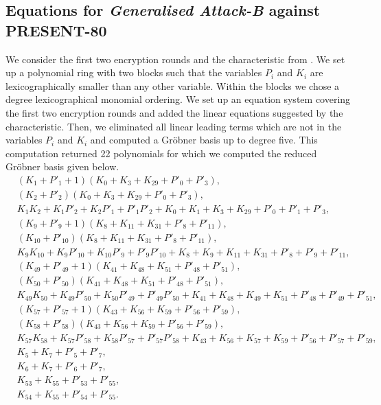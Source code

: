 \subsection{Equations for \emph{Generalised Attack-B} against PRESENT-80}
We consider the first two encryption rounds and the characteristic from \cite{present-dc:africacrypt}. We set up a polynomial ring with two blocks such that the variables $P_i$ and $K_i$ are lexicographically smaller than any other variable. Within the blocks we chose a degree lexicographical monomial ordering. We set up an equation system covering the first two encryption rounds and added the linear equations suggested by the characteristic. Then, we eliminated all linear leading terms which are not in the variables $P_i$ and $K_i$ and computed a Gröbner basis up to degree five. This computation returned 22 polynomials for which we computed the reduced Gröbner basis given below.
\begin{align*}
& {(K_{1} + P'_{1} + 1)} {(K_{0} + K_{3} + K_{29} + P'_{0} + P'_{3})},\\
& {(K_{2} + P'_{2})} {(K_{0} + K_{3} + K_{29} + P'_{0} + P'_{3})},\\
& K_{1} K_{2} + K_{1} P'_{2} + K_{2} P'_{1} + P'_{1} P'_{2} + K_{0} + K_{1} + K_{3} + K_{29} + P'_{0} + P'_{1} + P'_{3},\\
& {(K_{9} + P'_{9} + 1)} {(K_{8} + K_{11} + K_{31} + P'_{8} + P'_{11})},\\
& {(K_{10} + P'_{10})} {(K_{8} + K_{11} + K_{31} + P'_{8} + P'_{11})},\\
& K_{9} K_{10} + K_{9} P'_{10} + K_{10} P'_{9} + P'_{9} P'_{10} + K_{8} + K_{9} + K_{11} + K_{31} + P'_{8} + P'_{9} +
P'_{11},\\
& {(K_{49} + P'_{49} + 1)} {(K_{41} + K_{48} + K_{51} + P'_{48} + P'_{51})},\\
& {(K_{50} + P'_{50})} {(K_{41} + K_{48} + K_{51} + P'_{48} + P'_{51})},\\
& K_{49} K_{50} + K_{49} P'_{50} + K_{50} P'_{49} + P'_{49} P'_{50} + K_{41} + K_{48} + K_{49} + K_{51} + P'_{48} +
P'_{49} + P'_{51},\\
& {(K_{57} + P'_{57} + 1)} {(K_{43} + K_{56} + K_{59} + P'_{56} + P'_{59})},\\
& {(K_{58} + P'_{58})} {(K_{43} + K_{56} + K_{59} + P'_{56} + P'_{59})},\\
& K_{57} K_{58} + K_{57} P'_{58} + K_{58} P'_{57} + P'_{57} P'_{58} + K_{43} + K_{56} + K_{57} + K_{59} + P'_{56} +
P'_{57} + P'_{59},\\
& K_{5} + K_{7} + P'_{5} + P'_{7},\\
& K_{6} + K_{7} + P'_{6} + P'_{7},\\
& K_{53} + K_{55} + P'_{53} + P'_{55},\\
& K_{54} + K_{55} + P'_{54} + P'_{55}.\\
\end{align*}

